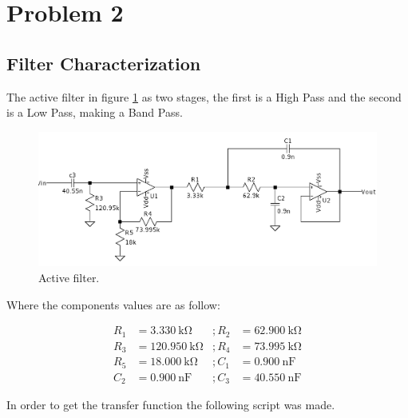 \section{Problem 2}

\subsection{Filter Characterization}

The active filter in figure \ref{fig:P2Circ} as two stages, the first is a High Pass and the second is a Low Pass, making a Band Pass.


\begin{figure}[H]
    \centering
    \includegraphics*[scale = 0.25]{Images/P2Circ.png}
    \caption{Active filter.}
    \label{fig:P2Circ}
\end{figure}

Where the components values are as follow:

\begin{equation}
    \begin{aligned}
        R_1 &= \SI{3.330}{\kilo\ohm}   &;R_2 &= \SI{62.900}{\kilo\ohm}\\
        R_3 &= \SI{120.950}{\kilo\ohm} &;R_4 &= \SI{73.995}{\kilo\ohm}\\
        R_5 &= \SI{18.000}{\kilo\ohm}  &;C_1 &= \SI{0.900}{\nano\farad}\\
        C_2 &= \SI{0.900}{\nano\farad} &;C_3 &= \SI{40.550}{\nano\farad}    
    \end{aligned}
\end{equation}

In order to get the transfer function the following script was made.

